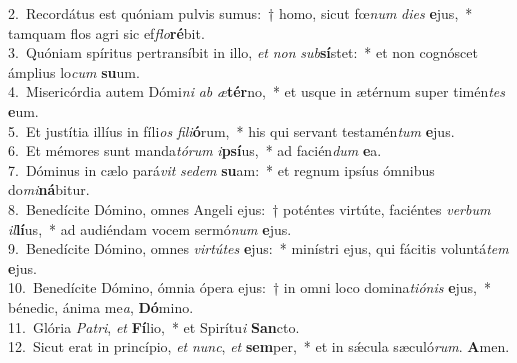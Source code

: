 {2.~}Recordátus est quóniam pulvis sumus:~† homo, sicut fœ\textit{num} \textit{di}\textit{es} \textbf{e}jus,~* tamquam flos agri sic ef\textit{flo}\textbf{ré}bit.\\
{3.~}Quóniam spíritus pertransíbit in illo, \textit{et} \textit{non} \textit{sub}\textbf{sí}stet:~* et non cognóscet ámplius lo\textit{cum} \textbf{su}um.\\
{4.~}Misericórdia autem Dómi\textit{ni} \textit{ab} \textit{æ}\textbf{tér}no,~* et usque in ætérnum super timén\textit{tes} \textbf{e}um.\\
{5.~}Et justítia illíus in fíli\textit{os} \textit{fi}\textit{li}\textbf{ó}rum,~* his qui servant testamén\textit{tum} \textbf{e}jus.\\
{6.~}Et mémores sunt manda\textit{tó}\textit{rum} \textit{i}\textbf{psí}us,~* ad facién\textit{dum} \textbf{e}a.\\
{7.~}Dóminus in cælo pará\textit{vit} \textit{se}\textit{dem} \textbf{su}am:~* et regnum ipsíus ómnibus do\textit{mi}\textbf{ná}bitur.\\
{8.~}Benedícite Dómino, omnes Angeli ejus:~† poténtes virtúte, faciéntes \textit{ver}\textit{bum} \textit{il}\textbf{lí}us,~* ad audiéndam vocem sermó\textit{num} \textbf{e}jus.\\
{9.~}Benedícite Dómino, omnes \textit{vir}\textit{tú}\textit{tes} \textbf{e}jus:~* minístri ejus, qui fácitis voluntá\textit{tem} \textbf{e}jus.\\
{10.~}Benedícite Dómino, ómnia ópera ejus:~† in omni loco domina\textit{ti}\textit{ó}\textit{nis} \textbf{e}jus,~* bénedic, ánima me\textit{a}, \textbf{Dó}mino.\\
{11.~}Glória \textit{Pa}\textit{tri}, \textit{et} \textbf{Fí}lio,~* et Spirítu\textit{i} \textbf{San}cto.\\
{12.~}Sicut erat in princípio, \textit{et} \textit{nunc}, \textit{et} \textbf{sem}per,~* et in sǽcula sæculó\textit{rum}. \textbf{A}men.\\
